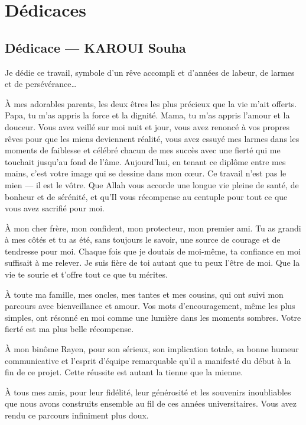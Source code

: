\documentclass[a4paper,12pt]{report}
\begin{document}
\chapter*{Dédicaces}

\section*{Dédicace — KAROUI Souha}

Je dédie ce travail, symbole d'un rêve accompli et d'années de labeur, de larmes et de persévérance…

À mes adorables parents, les deux êtres les plus précieux que la vie m'ait offerts. Papa, tu m'as appris la force et la dignité. Mama, tu m'as appris l'amour et la douceur. Vous avez veillé sur moi nuit et jour, vous avez renoncé à vos propres rêves pour que les miens deviennent réalité, vous avez essuyé mes larmes dans les moments de faiblesse et célébré chacun de mes succès avec une fierté qui me touchait jusqu'au fond de l'âme. Aujourd'hui, en tenant ce diplôme entre mes mains, c'est votre image qui se dessine dans mon cœur. Ce travail n'est pas le mien — il est le vôtre. Que Allah vous accorde une longue vie pleine de santé, de bonheur et de sérénité, et qu'Il vous récompense au centuple pour tout ce que vous avez sacrifié pour moi.

À mon cher frère, mon confident, mon protecteur, mon premier ami. Tu as grandi à mes côtés et tu as été, sans toujours le savoir, une source de courage et de tendresse pour moi. Chaque fois que je doutais de moi-même, ta confiance en moi suffisait à me relever. Je suis fière de toi autant que tu peux l'être de moi. Que la vie te sourie et t'offre tout ce que tu mérites.

À toute ma famille, mes oncles, mes tantes et mes cousins, qui ont suivi mon parcours avec bienveillance et amour. Vos mots d'encouragement, même les plus simples, ont résonné en moi comme une lumière dans les moments sombres. Votre fierté est ma plus belle récompense.

À mon binôme Rayen, pour son sérieux, son implication totale, sa bonne humeur communicative et l'esprit d'équipe remarquable qu'il a manifesté du début à la fin de ce projet. Cette réussite est autant la tienne que la mienne.

À tous mes amis, pour leur fidélité, leur générosité et les souvenirs inoubliables que nous avons construits ensemble au fil de ces années universitaires. Vous avez rendu ce parcours infiniment plus doux.
\end{document}
